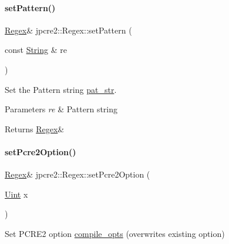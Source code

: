 \paragraph{\texorpdfstring{set\+Pattern()}{setPattern()}}
{\footnotesize\ttfamily \hyperlink{classjpcre2_1_1Regex}{Regex}\& jpcre2\+::\+Regex\+::set\+Pattern (\begin{DoxyParamCaption}\item[{const \hyperlink{namespacejpcre2_a91f03070152fb228bc116c5a737f1d16}{String} \&}]{re }\end{DoxyParamCaption})\hspace{0.3cm}{\ttfamily [inline]}}



Set the Pattern string \hyperlink{classjpcre2_1_1Regex_a0bceb85b6dbba355b56b5cc312214435}{pat\+\_\+str}. 


\begin{DoxyParams}{Parameters}
{\em re} & Pattern string \\
\hline
\end{DoxyParams}
\begin{DoxyReturn}{Returns}
\hyperlink{classjpcre2_1_1Regex}{Regex}\& 
\end{DoxyReturn}
\hypertarget{classjpcre2_1_1Regex_acdc6f97f4030ae109c4e1a4e2310bceb_acdc6f97f4030ae109c4e1a4e2310bceb}{}\label{classjpcre2_1_1Regex_acdc6f97f4030ae109c4e1a4e2310bceb_acdc6f97f4030ae109c4e1a4e2310bceb} 
\paragraph{\texorpdfstring{set\+Pcre2\+Option()}{setPcre2Option()}}
{\footnotesize\ttfamily \hyperlink{classjpcre2_1_1Regex}{Regex}\& jpcre2\+::\+Regex\+::set\+Pcre2\+Option (\begin{DoxyParamCaption}\item[{\hyperlink{namespacejpcre2_a078242d38221a13fb3543b9edd78c099}{Uint}}]{x }\end{DoxyParamCaption})\hspace{0.3cm}{\ttfamily [inline]}}



Set P\+C\+R\+E2 option \hyperlink{classjpcre2_1_1Regex_a5954131e9085de63229ed5c11417df69}{compile\+\_\+opts} (overwrites existing option) 


